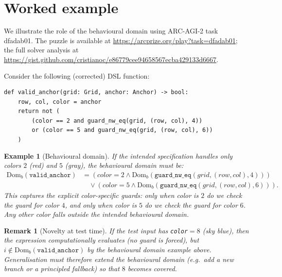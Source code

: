 \documentclass[11pt]{article}
\newtheorem{remark}{Remark}
\newtheorem{example}{Example}
\newcommand{\Domb}{\mathrm{Dom}_b}
\begin{document}
\section{Worked example}

We illustrate the role of the behavioural domain using ARC-AGI-2 task dfadab01. The puzzle is available at \url{https://arcprize.org/play?task=dfadab01}; the full solver analysis at \url{https://gist.github.com/cristianoc/e86779cee94658567ecba429133d6667}.

Consider the following (corrected) DSL function:
\begin{lstlisting}
def valid_anchor(grid: Grid, anchor: Anchor) -> bool:
    row, col, color = anchor
    return not (
        (color == 2 and guard_nw_eq(grid, (row, col), 4))
        or (color == 5 and guard_nw_eq(grid, (row, col), 6))
    )
\end{lstlisting}

\begin{example}[Behavioural domain]
If the intended specification handles only colors $2$ (red) and $5$ (gray), the behavioural domain must be:
\[
\begin{aligned}
\Domb(\texttt{valid\_anchor})
&= (color{=}2 \land \Domb(\texttt{guard\_nw\_eq}(grid,(row,col),4))) \\
&\quad \lor (color{=}5 \land \Domb(\texttt{guard\_nw\_eq}(grid,(row,col),6))).
\end{aligned}
\]
This captures the explicit color-specific guards: only when color is $2$ do we check the guard for color $4$, and only when color is $5$ do we check the guard for color $6$. Any other color falls outside the intended behavioural domain.
\end{example}

\begin{remark}[Novelty at test time]
If the test input has \texttt{color}$=8$ (sky blue), then the expression \emph{computationally} evaluates (no guard is forced), but $i\notin\Domb(\texttt{valid\_anchor})$ by the behavioural domain example above. Generalisation must therefore extend the behavioural domain (e.g.\ add a new branch or a principled fallback) so that $8$ becomes covered.
\end{remark}
\end{document}
